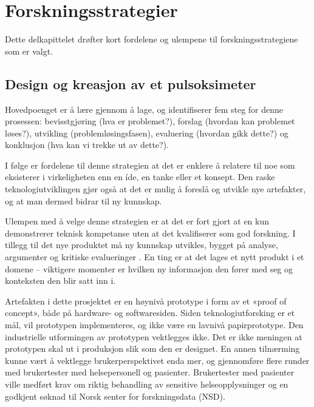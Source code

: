 \section{Forskningsstrategier}
\label{sec:forskningsstrategier}
Dette delkapittelet drøfter kort fordelene og ulempene til forskningsstrategiene som er valgt.

\subsection{Design og kreasjon av et pulsoksimeter}
Hovedpoenget er å lære gjennom å lage, og \citet{oates} identifiserer fem steg for denne prosessen:
bevisstgjøring (hva er problemet?), forslag (hvordan kan problemet løses?), utvikling (problemløsingsfasen), evaluering (hvordan gikk dette?)
og konklusjon (hva kan vi trekke ut av dette?).

I følge \citet[s.121-122]{oates} er fordelene til denne strategien at det er enklere å relatere til noe som eksisterer i virkeligheten enn en íde, en tanke eller et konsept.
Den raske teknologiutviklingen gjør også at det er mulig å foreslå og utvikle nye artefakter, og at man dermed bidrar til ny kunnskap.

Ulempen med å velge denne strategien er at det er fort gjort at en kun demonstrerer
teknisk kompetanse uten at det kvalifiserer som god forskning. I tillegg til det nye produktet må ny kunnskap utvikles, bygget på analyse, argumenter
og kritiske evalueringer \citep[s. 109]{oates}. En ting er at det lages et nytt produkt i et domene -- viktigere momenter er hvilken ny informasjon den fører
med seg og konteksten den blir satt inn i.

Artefakten i dette prosjektet er en høynivå prototype i form av et «proof of concept», både på hardware- og softwaresiden. Siden teknologiutforsking er et mål, vil
prototypen implementeres, og ikke være en lavnivå papirprototype. Den industrielle utformingen av prototypen vektlegges ikke. Det er
ikke meningen at prototypen skal ut i produksjon slik som den er designet. En annen tilnærming kunne vært å vektlegge brukerperspektivet enda mer,
og gjennomføre flere runder med brukertester med helsepersonell og pasienter. Brukertester med pasienter ville medført krav om riktig behandling av sensitive
helseopplysninger og en godkjent søknad til Norsk senter for forskningsdata (NSD).


